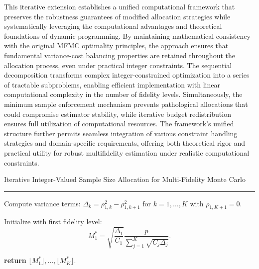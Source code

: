 
This iterative extension establishes a unified computational framework that preserves the robustness guarantees of modified allocation strategies while systematically leveraging the computational advantages and theoretical foundations of dynamic programming. By maintaining mathematical consistency with the original MFMC optimality principles, the approach ensures that fundamental variance-cost balancing properties are retained throughout the allocation process, even under practical integer constraints. The sequential decomposition transforms complex integer-constrained optimization into a series of tractable subproblems, enabling efficient implementation with linear computational complexity in the number of fidelity levels. Simultaneously, the minimum sample enforcement mechanism prevents pathological allocations that could compromise estimator stability, while iterative budget redistribution ensures full utilization of computational resources. The framework's unified structure further permits seamless integration of various constraint handling strategies and domain-specific requirements, offering both theoretical rigor and practical utility for robust multifidelity estimation under realistic computational constraints.


\begin{algorithm}[!ht]
\caption{Iterative Integer-Valued Sample Size Allocation for Multi-Fidelity Monte Carlo}
\label{algo:Iterative_MFMC_Algo}
\DontPrintSemicolon

\hrule\vspace{1ex}


Compute variance terms: $\Delta_k = \rho_{1,k}^2 - \rho_{1,k+1}^2$ for $k = 1, \dots, K$ with $\rho_{1,K+1}=0$.


Initialize with first fidelity level:
\[
M_1^* = \sqrt{\frac{\Delta_1}{C_1}} \frac{p}{ \sum_{j=1}^K \sqrt{C_j \Delta_j}}.
\]


\textbf{return} $\lfloor M_1^* \rfloor, \dots, \lfloor M_K^* \rfloor$.
\end{algorithm}



